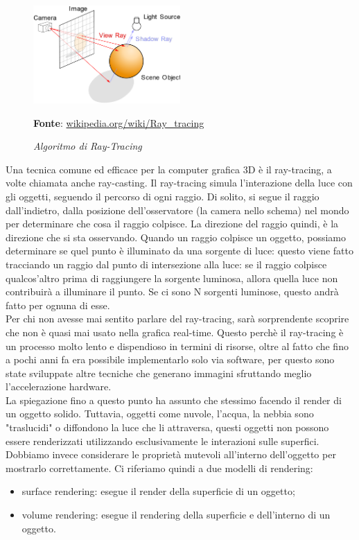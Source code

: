 \begin{figure}[h]
    \centering
    \includegraphics[width=0.5\textwidth]{immagini/volumerendering/ray_tracing_diagram.png}
    \caption{\textit{Algoritmo di Ray-Tracing}}
    \textbf{Fonte}: \href{https://en.wikipedia.org/wiki/Ray_tracing_(graphics)}{wikipedia.org/wiki/Ray\_tracing}
    \label{fig: Algoritmo di Ray-Tracing}
\end{figure}

Una tecnica comune ed efficace per la computer grafica 3D è il ray-tracing, a volte chiamata anche ray-casting. Il ray-tracing simula l'interazione della luce con gli oggetti, seguendo il percorso di ogni raggio. Di solito, si segue il raggio dall'indietro, dalla posizione dell'osservatore (la camera nello schema) nel mondo per determinare che cosa il raggio colpisce. La direzione del raggio quindi, è la direzione che si sta osservando. Quando un raggio colpisce un oggetto, possiamo determinare se quel punto è illuminato da una sorgente di luce: questo viene fatto tracciando un raggio dal punto di intersezione alla luce: se il raggio colpisce qualcos'altro prima di raggiungere la sorgente luminosa, allora quella luce non contribuirà a illuminare il punto. Se ci sono N sorgenti luminose, questo andrà fatto per ognuna di esse.
\\
Per chi non avesse mai sentito parlare del ray-tracing, sarà sorprendente scoprire che non è quasi mai usato nella grafica real-time. Questo perchè il ray-tracing è un processo molto lento e dispendioso in termini di risorse, oltre al fatto che fino a pochi anni fa era possibile implementarlo solo via software, per questo sono state sviluppate altre tecniche che generano immagini sfruttando meglio l'accelerazione hardware.
\\
La spiegazione fino a questo punto ha assunto che stessimo facendo il render di un oggetto solido. Tuttavia, oggetti come nuvole, l'acqua, la nebbia sono "traslucidi" o diffondono la luce che li attraversa, questi oggetti non possono essere renderizzati utilizzando esclusivamente le interazioni sulle superfici. Dobbiamo invece considerare le proprietà mutevoli all'interno dell'oggetto per mostrarlo correttamente. Ci riferiamo quindi a due modelli di rendering:
\begin{itemize}
\item surface rendering: esegue il render della superficie di un oggetto;
\item volume rendering: esegue il rendering della superficie e dell'interno di un oggetto.
\end{itemize}

